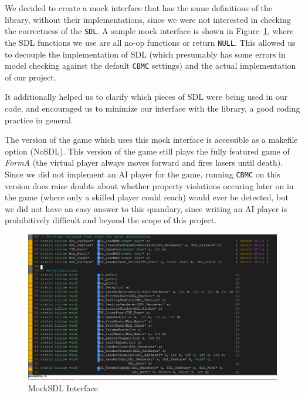 \documentclass{article}
\newcommand{\Name}{\textit{FormA}\xspace}
\newcommand{\cbmc}{\texttt{CBMC}}
\newcommand{\sdl}{\texttt{SDL}}
\begin{document}
            We decided to create a mock interface that has the same definitions
            of the library, without their implementations, since we were not
            interested in checking the correctness of the \sdl{}.
            A sample mock interface is shown in Figure~\ref{fig:mock-sdl}, where
            the SDL functions we use are all no-op functions or return
            \texttt{NULL}. This allowed us to decouple the implementation of
            SDL (which presumably has some errors in model checking against the
            default \cbmc{} settings) and the actual implementation of our
            project.

            It additionally helped us to clarify which pieces of SDL were being
            used in our code, and encouraged us to minimize our interface with
            the library, a good coding practice in general.

            The version of the game which uses this mock interface is accessible
            as a makefile option (NoSDL). This version of the game still plays
            the fully featured game of \Name{} (the virtual player always moves
            forward and fires lasers until death). Since we did not implement
            an AI player for the game, running \cbmc{} on this version does
            raise doubts about whether property violations occuring later on in
            the game (where only a skilled player could reach) would ever be
            detected, but we did not have an easy answer to this quandary, since
            writing an AI player is prohibitively difficult and beyond the scope
            of this project.

            \begin{figure}[h!]
                \includegraphics[width=\linewidth]{mock-sdl.png}
                \caption{MockSDL Interface}
                \label{fig:mock-sdl}
            \end{figure}
\end{document}
